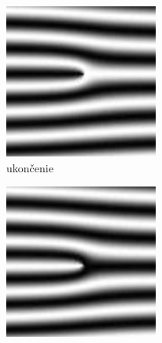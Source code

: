   \begin{figure}[h]\centering
    \centering
    \begin{subfigure}[b]{0.19\linewidth}
      \includegraphics[width=\linewidth]{obrazky-figures/markanty/ukoncenie.png}
      \caption{ukončenie}
      \label{obr:markant_ukoncenie}
    \end{subfigure}
    \hfill
    \begin{subfigure}[b]{0.19\linewidth}
      \includegraphics[width=\linewidth]{obrazky-figures/markanty/vidlicka.png}

\end{subfigure}
\end{figure}
